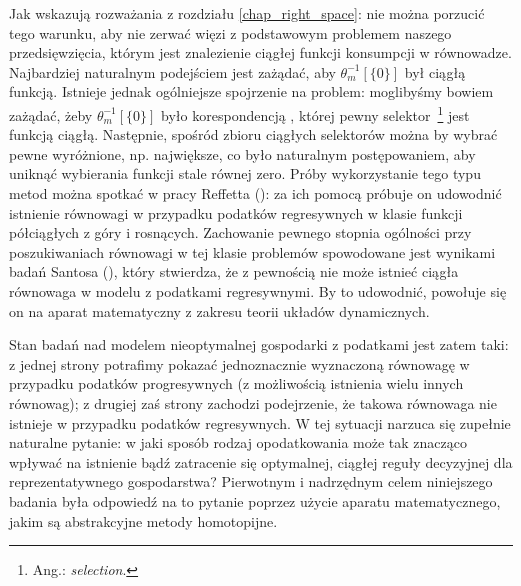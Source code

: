 Jak wskazują rozważania z rozdziału \ref{chap_right_space}: nie można porzucić tego warunku, aby nie zerwać więzi z podstawowym problemem naszego przedsięwzięcia, którym jest znalezienie ciągłej funkcji konsumpcji w równowadze. Najbardziej naturalnym podejściem jest zażądać, aby $\theta_m^{-1}[\{ 0\}]$ był ciągłą funkcją. Istnieje jednak ogólniejsze spojrzenie na problem: moglibyśmy bowiem zażądać, żeby $\theta_m^{-1}[\{ 0\}]$ było korespondencją \citep[patrz:][]{Rockafellar_2010}, której pewny selektor~\footnote{Ang.: {\it selection}.} jest funkcją ciągłą. Następnie, spośród zbioru ciągłych selektorów można by wybrać pewne wyróżnione, np. największe, co było naturalnym postępowaniem, aby uniknąć wybierania funkcji stale równej zero. Próby wykorzystanie tego typu metod można spotkać w pracy Reffetta (\citeyear{Reffett}): za ich pomocą próbuje on udowodnić istnienie równowagi w przypadku podatków regresywnych w klasie funkcji półciągłych z góry i rosnących. Zachowanie pewnego stopnia ogólności przy poszukiwaniach równowagi w tej klasie problemów spowodowane jest wynikami badań Santosa (\citeyear{Santos_2002}), który stwierdza, że z pewnością nie może istnieć ciągła równowaga w modelu z podatkami regresywnymi. By to udowodnić, powołuje się on na aparat matematyczny z zakresu teorii układów dynamicznych. 

	Stan badań nad modelem nieoptymalnej gospodarki z podatkami jest zatem taki: z jednej strony potrafimy pokazać jednoznacznie wyznaczoną równowagę w przypadku podatków progresywnych (z możliwością istnienia wielu innych równowag); z drugiej zaś strony zachodzi podejrzenie, że takowa równowaga nie istnieje w przypadku podatków regresywnych. W tej sytuacji narzuca się zupełnie naturalne pytanie:  w jaki sposób rodzaj opodatkowania może tak znacząco wpływać na istnienie bądź zatracenie się optymalnej, ciągłej reguły decyzyjnej dla reprezentatywnego gospodarstwa? Pierwotnym i nadrzędnym celem niniejszego badania była odpowiedź na to pytanie poprzez użycie aparatu matematycznego, jakim są abstrakcyjne metody homotopijne. 
	
